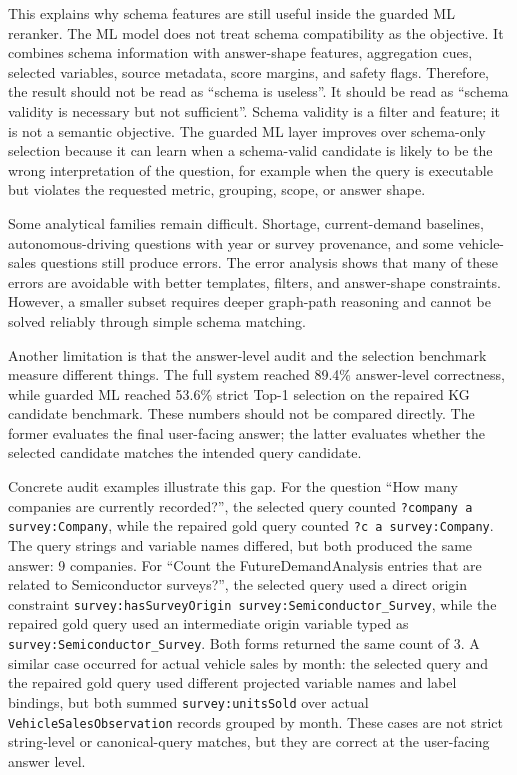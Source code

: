 \documentclass[
  12pt,
  english,
  oneside]{report}
\begin{document}
This explains why schema features are still useful inside the guarded ML reranker. The ML model does not treat schema compatibility as the objective. It combines schema information with answer-shape features, aggregation cues, selected variables, source metadata, score margins, and safety flags. Therefore, the result should not be read as ``schema is useless''. It should be read as ``schema validity is necessary but not sufficient''. Schema validity is a filter and feature; it is not a semantic objective. The guarded ML layer improves over schema-only selection because it can learn when a schema-valid candidate is likely to be the wrong interpretation of the question, for example when the query is executable but violates the requested metric, grouping, scope, or answer shape.

Some analytical families remain difficult. Shortage, current-demand baselines, autonomous-driving questions with year or survey provenance, and some vehicle-sales questions still produce errors. The error analysis shows that many of these errors are avoidable with better templates, filters, and answer-shape constraints. However, a smaller subset requires deeper graph-path reasoning and cannot be solved reliably through simple schema matching.

Another limitation is that the answer-level audit and the selection benchmark measure different things. The full system reached 89.4\% answer-level correctness, while guarded ML reached 53.6\% strict Top-1 selection on the repaired KG candidate benchmark. These numbers should not be compared directly. The former evaluates the final user-facing answer; the latter evaluates whether the selected candidate matches the intended query candidate.

Concrete audit examples illustrate this gap. For the question ``How many companies are currently recorded?'', the selected query counted \texttt{?company a survey:Company}, while the repaired gold query counted \texttt{?c a survey:Company}. The query strings and variable names differed, but both produced the same answer: 9 companies. For ``Count the FutureDemandAnalysis entries that are related to Semiconductor surveys?'', the selected query used a direct origin constraint \texttt{survey:hasSurveyOrigin survey:Semiconductor\_Survey}, while the repaired gold query used an intermediate origin variable typed as \texttt{survey:Semiconductor\_Survey}. Both forms returned the same count of 3. A similar case occurred for actual vehicle sales by month: the selected query and the repaired gold query used different projected variable names and label bindings, but both summed \texttt{survey:unitsSold} over actual \texttt{VehicleSalesObservation} records grouped by month. These cases are not strict string-level or canonical-query matches, but they are correct at the user-facing answer level.
\end{document}
